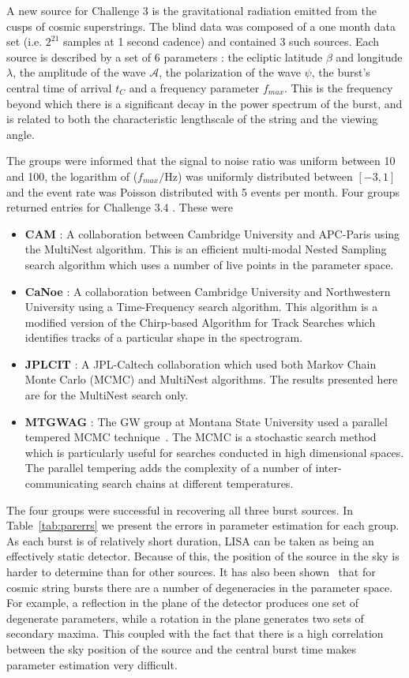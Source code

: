 \documentclass{iopart}
\begin{document}
A new source for Challenge 3 is the gravitational radiation emitted from the cusps of cosmic superstrings.  The blind data was composed of a one month data set (i.e. $2^{21}$ samples at 1 second cadence) and contained 3 such sources.  Each source is described
by a set of 6 parameters : the ecliptic latitude $\beta$ and longitude $\lambda$, the amplitude of the wave ${\mathcal A}$, the polarization of the wave $\psi$, the burst's
central time of arrival $t_C$ and a frequency parameter $f_{max}$.  This is the frequency beyond which there is a significant decay in the power spectrum of the burst, and is related to both the characteristic lengthscale of the string and the viewing angle.

The groups were informed that the signal to noise ratio was uniform between 10 and 100, the logarithm of ($f_{max}/$Hz) was uniformly distributed between $[-3,1]$ and the event rate was Poisson distributed with 5 events per month.  Four groups returned entries for Challenge 3.4 .  These were
\begin{itemize}
\item \textbf{CAM} :  A collaboration between Cambridge University and APC-Paris using the MultiNest algorithm. This is an efficient multi-modal
Nested Sampling search algorithm which uses a number of live points in the parameter space.  
\item \textbf{CaNoe} : A collaboration between Cambridge University and Northwestern University using a Time-Frequency search algorithm. This algorithm is a modified
version of the Chirp-based Algorithm for Track Searches which identifies tracks of a particular shape in the spectrogram.
\item \textbf{JPLCIT} : A JPL-Caltech collaboration which used both Markov Chain Monte Carlo (MCMC) and MultiNest algorithms.  The results presented here are for 
the MultiNest search only.
\item \textbf{MTGWAG} : The GW group at Montana State University used a parallel tempered MCMC technique~\cite{keycornish}.  The MCMC is a stochastic search method which is particularly
useful for searches conducted in high dimensional spaces.  The parallel tempering adds the complexity of a number of inter-communicating search
chains at different temperatures.
\end{itemize}

The four groups were successful in recovering all three burst sources.  In Table~\ref{tab:parerrs} we present the errors in parameter estimation for each group.  As each burst is of relatively short duration, LISA can be taken as being an effectively static detector.  Because of this, the position of the source in the sky is harder to determine than for other sources.  It has also been shown~\cite{keycornish} that for cosmic string bursts there are a number of degeneracies in the parameter space.  For example, a reflection in the plane of the detector produces one set of degenerate parameters, while a rotation in the plane generates two sets of secondary maxima.  This coupled with the fact that there is a high correlation between the sky position of the source and the central burst time makes parameter estimation very difficult.  
\end{document}
